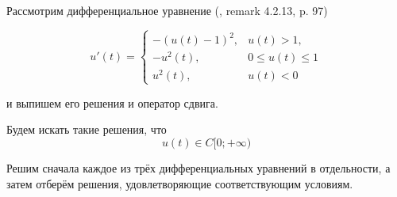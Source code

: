 

Рассмотрим дифференциальное уравнение (\cite{Vorotnikov}, remark 4.2.13, p. 97)

\begin{equation}\label{primer_iz_statyi}
	u'(t)=
	\left\{
		\begin{array}{ll}
			-(u(t)-1)^2, & u(t) > 1, \\
			-u^2 (t)   , & 0 \leq u(t) \leq 1 \\
			u^2 (t)    , & u(t) < 0
		\end{array}
	\right.
\end{equation}

и выпишем его решения и оператор сдвига.

Будем искать такие решения, что
\begin{equation}
	u(t) \in C[0; +\infty)
\end{equation}

Решим сначала каждое из трёх дифференциальных уравнений в отдельности, а затем отберём решения,
удовлетворяющие соответствующим условиям.


